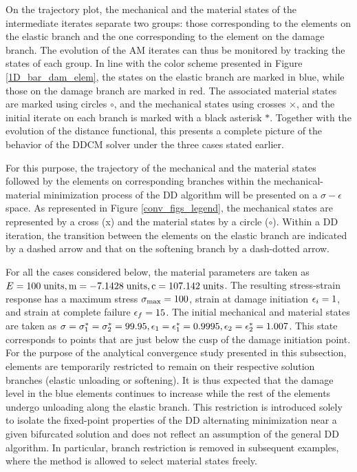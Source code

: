 \documentclass[10pt]{cas-sc}
\newcommand{\added}[1]{#1}
\begin{document}
\added{On the trajectory plot, the mechanical and the material states of the intermediate iterates separate two groups: those corresponding to the elements on the elastic branch and the one corresponding to the element on the damage branch. The evolution of the AM iterates can thus be monitored by tracking the states of each group. In line with the color scheme presented in Figure \ref{1D_bar_dam_elem}, the states on the elastic branch are marked in blue, while those on the damage branch are marked in red. The associated material states are marked using circles $\circ$, and the mechanical states using crosses $\times$, and the initial iterate on each branch is marked with a black asterisk $\ast$. Together with the evolution of the distance functional, this presents a complete picture of the behavior of the DDCM solver under the three cases stated earlier.}

\begin{deletedblock}
For this purpose, the trajectory of the mechanical and the material states followed by the elements on corresponding branches within the mechanical-material minimization process of the DD algorithm will be presented on a $\sigma-\epsilon$ space. As represented in Figure \ref{conv_figs_legend}, the mechanical states are represented by a cross (x) and the material states by a circle ($\circ$). Within a DD iteration, the transition between the elements on the elastic branch are indicated by a dashed arrow and that on the softening branch by a dash-dotted arrow.

For all the cases considered below, the material parameters are taken as $ E=100 \rm{\;units}, m=-7.1428\rm{\;units}, c=107.142\rm{\;units}$. The resulting stress-strain response has a maximum stress ${\sigma}_{\rm max} = 100$, strain at damage initiation ${\epsilon}_i=1$, and strain at complete failure ${\epsilon}_f=15$. The initial mechanical and material states are taken as ${\sigma}={\sigma}_1^*={\sigma}_2^*=99.95,{\epsilon}_1={\epsilon}_1^* =0.9995,{\epsilon}_2={\epsilon}_2^* =1.007$. This state corresponds to points that are just below the cusp of the damage initiation point. For the purpose of the analytical convergence study presented in this subsection, elements are temporarily restricted to remain on their respective solution branches (elastic unloading or softening). It is thus expected that the damage level in the blue elements continues to increase while the rest of the elements undergo unloading along the elastic branch. This restriction is introduced solely to isolate the fixed-point properties of the DD alternating minimization near a given bifurcated solution and does not reflect an assumption of the general DD algorithm. In particular, branch restriction is removed in subsequent examples, where the method is allowed to select material states freely. 

\end{deletedblock}
\end{document}
